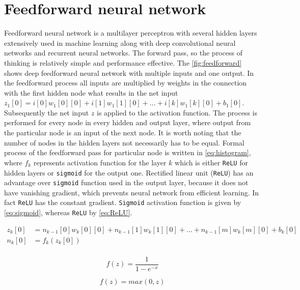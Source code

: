 \section{Feedforward neural network}
Feedforward neural network is a multilayer perceptron with several hidden layers extensively used in machine learning along with deep convolutional neural networks and recurrent neural networks. The forward pass, so the process of thinking is relatively simple and performance effective. The \figurename{} \ref{fig:feedforward} shows deep feedforward neural network with multiple inputs and one output. In the feedforward process all inputs are multiplied by weights in the connection with the first hidden node what results in the net input $z_1[0]=i[0]w_1[0][0]+i[1]w_1[1][0]+\dots+i[k]w_1[k][0] + b_1[0]$. Subsequently the net input $z$ is applied to the activation function. The process is performed for every node in every hidden and output layer, where output from the particular node is an input of the next node. It is worth noting that the number of nodes in the hidden layers not necessarily has to be equal. Formal process of the feedforward pass for particular node is written in \ref{eq:histogram}, where $f_k$ represents activation function for the layer $k$ which is either \verb|ReLU| for hidden layers or \verb|sigmoid| for the output one. Rectified linear unit (\verb|ReLU|) has an advantage over \verb|sigmoid| function used in the output layer, because it does not have vanishing gradient, which prevents neural network from efficient learning. In fact \verb|ReLU| has the constant gradient. \verb|Sigmoid| activation function is given by \ref{eq:sigmoid}, whereas \verb|ReLU| by \ref{eq:ReLU}.

\begin{equation} \label{eq:feedforward}
\begin{aligned}
    z_k[0]&=n_{k-1}[0]w_k[0][0]+n_{k-1}[1]w_k[1][0]+\dots+n_{k-1}[m]w_k[m][0] + b_k[0] \\
    n_k[0]&=f_k(z_k[0]) \\
\end{aligned}
\end{equation}

\begin{equation} \label{eq:sigmoid}
f(z)=\frac{1}{1-e^{-x}}
\end{equation}

\begin{equation} \label{eq:ReLU}
f(z)=max(0, z)
\end{equation}

